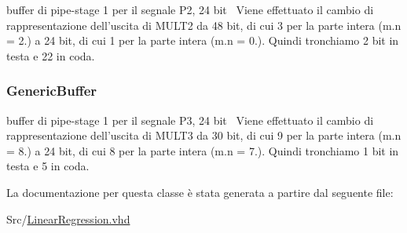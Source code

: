 buffer di pipe-\/stage 1 per il segnale P2, 24 bit~\newline
 Viene effettuato il cambio di rappresentazione dell'uscita di M\+U\+L\+T2 da 48 bit, di cui 3 per la parte intera (m.\+n = 2.) a 24 bit, di cui 1 per la parte intera (m.\+n = 0.). Quindi tronchiamo 2 bit in testa e 22 in coda. 

\hypertarget{class_linear_regression_1_1_structural_a561aaea076fe5b5174fc967b43b9a50b}{
\subsubsection[{pipestage1\+\_\+buff\+\_\+p3}]{ {\bfseries \textcolor{vhdlchar}{Generic\+Buffer}\textcolor{vhdlchar}{ }} \hspace{0.3cm}{\ttfamily [Instantiation]}}}\label{class_linear_regression_1_1_structural_a561aaea076fe5b5174fc967b43b9a50b}


buffer di pipe-\/stage 1 per il segnale P3, 24 bit~\newline
 Viene effettuato il cambio di rappresentazione dell'uscita di M\+U\+L\+T3 da 30 bit, di cui 9 per la parte intera (m.\+n = 8.) a 24 bit, di cui 8 per la parte intera (m.\+n = 7.). Quindi tronchiamo 1 bit in testa e 5 in coda. 



La documentazione per questa classe è stata generata a partire dal seguente file\+:\begin{DoxyCompactItemize}
\item 
Src/\hyperlink{_linear_regression_8vhd}{Linear\+Regression.\+vhd}\end{DoxyCompactItemize}
